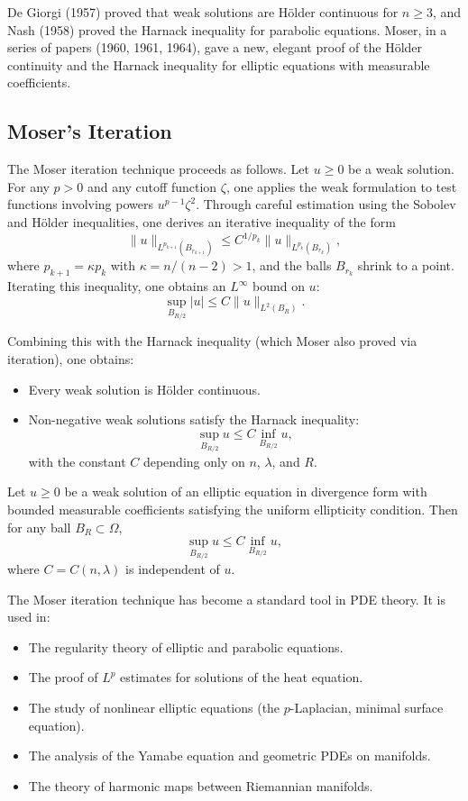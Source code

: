De Giorgi (1957) proved that weak solutions are H\"older continuous for $n \geq 3$, and Nash (1958) proved the Harnack inequality for parabolic equations. Moser, in a series of papers (1960, 1961, 1964), gave a new, elegant proof of the H\"older continuity and the Harnack inequality for elliptic equations with measurable coefficients.

\subsection{Moser's Iteration}

The Moser iteration technique proceeds as follows. Let $u \geq 0$ be a weak solution. For any $p > 0$ and any cutoff function $\zeta$, one applies the weak formulation to test functions involving powers $u^{p-1} \zeta^2$. Through careful estimation using the Sobolev and H\"older inequalities, one derives an iterative inequality of the form
\[
\|u\|_{L^{p_{k+1}}(B_{r_{k+1}})} \leq C^{1/p_k} \|u\|_{L^{p_k}(B_{r_k})},
\]
where $p_{k+1} = \kappa p_k$ with $\kappa = n/(n-2) > 1$, and the balls $B_{r_k}$ shrink to a point. Iterating this inequality, one obtains an $L^\infty$ bound on $u$:
\[
\sup_{B_{R/2}} |u| \leq C \|u\|_{L^2(B_R)}.
\]

Combining this with the Harnack inequality (which Moser also proved via iteration), one obtains:
\begin{itemize}
\item Every weak solution is H\"older continuous.
\item Non-negative weak solutions satisfy the Harnack inequality:
\[
\sup_{B_{R/2}} u \leq C \inf_{B_{R/2}} u,
\]
with the constant $C$ depending only on $n$, $\lambda$, and $R$.
\end{itemize}

\begin{theorem}
Let $u \geq 0$ be a weak solution of an elliptic equation in divergence form with bounded measurable coefficients satisfying the uniform ellipticity condition. Then for any ball $B_R \subset \Omega$,
\[
\sup_{B_{R/2}} u \leq C \inf_{B_{R/2}} u,
\]
where $C = C(n, \lambda)$ is independent of $u$.
\end{theorem}

The Moser iteration technique has become a standard tool in PDE theory. It is used in:
\begin{itemize}
\item The regularity theory of elliptic and parabolic equations.
\item The proof of $L^p$ estimates for solutions of the heat equation.
\item The study of nonlinear elliptic equations (the $p$-Laplacian, minimal surface equation).
\item The analysis of the Yamabe equation and geometric PDEs on manifolds.
\item The theory of harmonic maps between Riemannian manifolds.
\end{itemize}


